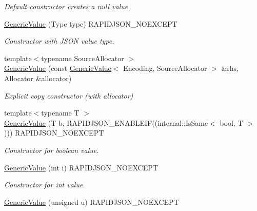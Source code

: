 \begin{DoxyCompactItemize}
\begin{DoxyCompactList}\small\item\em Default constructor creates a null value. \end{DoxyCompactList}\item 
\hyperlink{class_generic_value_a83c8f84b8e61f2f40414b703b75aea61}{Generic\+Value} (Type type) R\+A\+P\+I\+D\+J\+S\+O\+N\+\_\+\+N\+O\+E\+X\+C\+E\+PT
\begin{DoxyCompactList}\small\item\em Constructor with J\+S\+ON value type. \end{DoxyCompactList}\item 
{\footnotesize template$<$typename Source\+Allocator $>$ }\\\hyperlink{class_generic_value_a5161c0c98ba9144c50a38acde28a5ede}{Generic\+Value} (const \hyperlink{class_generic_value}{Generic\+Value}$<$ Encoding, Source\+Allocator $>$ \&rhs, Allocator \&allocator)
\begin{DoxyCompactList}\small\item\em Explicit copy constructor (with allocator) \end{DoxyCompactList}\item 
{\footnotesize template$<$typename T $>$ }\\\hyperlink{class_generic_value_a0f6a0394bfffaedde88e433b2265194c}{Generic\+Value} (T b, R\+A\+P\+I\+D\+J\+S\+O\+N\+\_\+\+E\+N\+A\+B\+L\+E\+IF((internal\+::\+Is\+Same$<$ bool, T $>$))) R\+A\+P\+I\+D\+J\+S\+O\+N\+\_\+\+N\+O\+E\+X\+C\+E\+PT
\begin{DoxyCompactList}\small\item\em Constructor for boolean value. \end{DoxyCompactList}\item 
\hyperlink{class_generic_value_aafc754ade38421c179f5c8933ecbaf45}{Generic\+Value} (int i) R\+A\+P\+I\+D\+J\+S\+O\+N\+\_\+\+N\+O\+E\+X\+C\+E\+PT\hypertarget{class_generic_value_aafc754ade38421c179f5c8933ecbaf45}{}\label{class_generic_value_aafc754ade38421c179f5c8933ecbaf45}

\begin{DoxyCompactList}\small\item\em Constructor for int value. \end{DoxyCompactList}\item 
\hyperlink{class_generic_value_a972bff6c56ac3d04622ff7fad8d98331}{Generic\+Value} (unsigned u) R\+A\+P\+I\+D\+J\+S\+O\+N\+\_\+\+N\+O\+E\+X\+C\+E\+PT\hypertarget{class_generic_value_a972bff6c56ac3d04622ff7fad8d98331}{}\label{class_generic_value_a972bff6c56ac3d04622ff7fad8d98331}


\end{DoxyCompactItemize}

